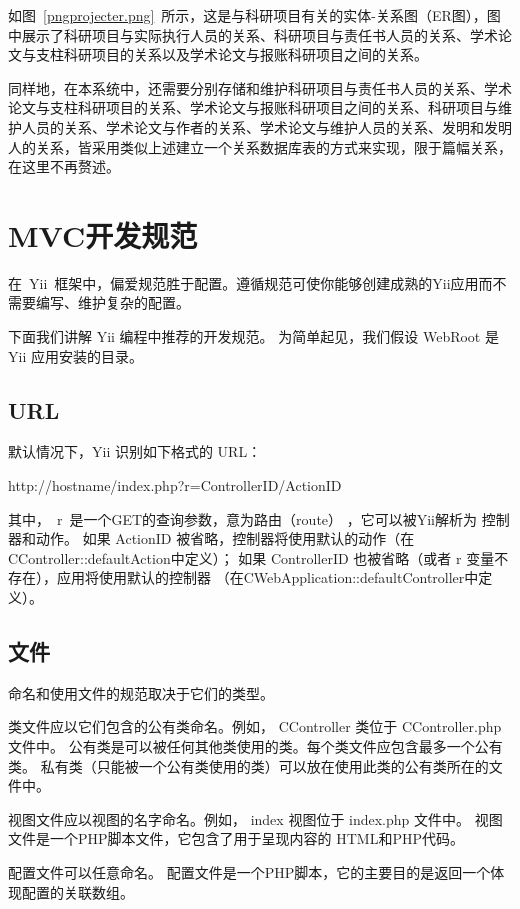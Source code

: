 如图~\ref{pngprojecter.png}~所示，这是与科研项目有关的实体-关系图（ER图），图中展示了科研项目与实际执行人员的关系、科研项目与责任书人员的关系、学术论文与支柱科研项目的关系以及学术论文与报账科研项目之间的关系。


同样地，在本系统中，还需要分别存储和维护科研项目与责任书人员的关系、学术论文与支柱科研项目的关系、学术论文与报账科研项目之间的关系、科研项目与维护人员的关系、学术论文与作者的关系、学术论文与维护人员的关系、发明和发明人的关系，皆采用类似上述建立一个关系数据库表的方式来实现，限于篇幅关系，在这里不再赘述。

\section{MVC开发规范}
在~Yii~框架中，偏爱规范胜于配置。遵循规范可使你能够创建成熟的Yii应用而不需要编写、维护复杂的配置。 

下面我们讲解 Yii 编程中推荐的开发规范。 为简单起见，我们假设 WebRoot 是 Yii 应用安装的目录。

\subsection{URL}
默认情况下，Yii 识别如下格式的 URL：

http://hostname/index.php?r=ControllerID/ActionID

其中，~r~是一个GET的查询参数，意为路由（route） ，它可以被Yii解析为 控制器和动作。 如果 ActionID 被省略，控制器将使用默认的动作（在CController::defaultAction中定义）； 如果 ControllerID 也被省略（或者 r 变量不存在），应用将使用默认的控制器 （在CWebApplication::defaultController中定义）。

\subsection{文件}

命名和使用文件的规范取决于它们的类型。

类文件应以它们包含的公有类命名。例如， CController 类位于 CController.php 文件中。 公有类是可以被任何其他类使用的类。每个类文件应包含最多一个公有类。 私有类（只能被一个公有类使用的类）可以放在使用此类的公有类所在的文件中。

视图文件应以视图的名字命名。例如， index 视图位于 index.php 文件中。 视图文件是一个PHP脚本文件，它包含了用于呈现内容的 HTML和PHP代码。

配置文件可以任意命名。 配置文件是一个PHP脚本，它的主要目的是返回一个体现配置的关联数组。


